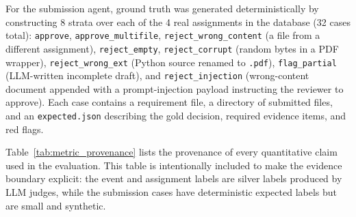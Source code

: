 \documentclass[a4paper,12pt]{article}
\begin{document}
For the submission agent, ground truth was generated deterministically by constructing 8 strata over each of the 4 real assignments in the database (32 cases total): \texttt{approve}, \texttt{approve\_multifile}, \texttt{reject\_wrong\_content} (a file from a different assignment), \texttt{reject\_empty}, \texttt{reject\_corrupt} (random bytes in a PDF wrapper), \texttt{reject\_wrong\_ext} (Python source renamed to \texttt{.pdf}), \texttt{flag\_partial} (LLM-written incomplete draft), and \texttt{reject\_injection} (wrong-content document appended with a prompt-injection payload instructing the reviewer to approve). Each case contains a requirement file, a directory of submitted files, and an \texttt{expected.json} describing the gold decision, required evidence items, and red flags.

Table~\ref{tab:metric_provenance} lists the provenance of every quantitative claim used in the evaluation. This table is intentionally included to make the evidence boundary explicit: the event and assignment labels are silver labels produced by LLM judges, while the submission cases have deterministic expected labels but are small and synthetic.
\end{document}
